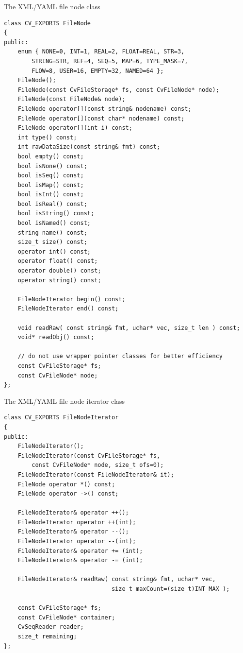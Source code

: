 \label{FileNode}
The XML/YAML file node class

\begin{lstlisting}
class CV_EXPORTS FileNode
{
public:
    enum { NONE=0, INT=1, REAL=2, FLOAT=REAL, STR=3,
        STRING=STR, REF=4, SEQ=5, MAP=6, TYPE_MASK=7,
        FLOW=8, USER=16, EMPTY=32, NAMED=64 };
    FileNode();
    FileNode(const CvFileStorage* fs, const CvFileNode* node);
    FileNode(const FileNode& node);
    FileNode operator[](const string& nodename) const;
    FileNode operator[](const char* nodename) const;
    FileNode operator[](int i) const;
    int type() const;
    int rawDataSize(const string& fmt) const;
    bool empty() const;
    bool isNone() const;
    bool isSeq() const;
    bool isMap() const;
    bool isInt() const;
    bool isReal() const;
    bool isString() const;
    bool isNamed() const;
    string name() const;
    size_t size() const;
    operator int() const;
    operator float() const;
    operator double() const;
    operator string() const;

    FileNodeIterator begin() const;
    FileNodeIterator end() const;

    void readRaw( const string& fmt, uchar* vec, size_t len ) const;
    void* readObj() const;

    // do not use wrapper pointer classes for better efficiency
    const CvFileStorage* fs;
    const CvFileNode* node;
};
\end{lstlisting}

\label{FileNodeIterator}
The XML/YAML file node iterator class

\begin{lstlisting}
class CV_EXPORTS FileNodeIterator
{
public:
    FileNodeIterator();
    FileNodeIterator(const CvFileStorage* fs,
        const CvFileNode* node, size_t ofs=0);
    FileNodeIterator(const FileNodeIterator& it);
    FileNode operator *() const;
    FileNode operator ->() const;

    FileNodeIterator& operator ++();
    FileNodeIterator operator ++(int);
    FileNodeIterator& operator --();
    FileNodeIterator operator --(int);
    FileNodeIterator& operator += (int);
    FileNodeIterator& operator -= (int);

    FileNodeIterator& readRaw( const string& fmt, uchar* vec,
                               size_t maxCount=(size_t)INT_MAX );

    const CvFileStorage* fs;
    const CvFileNode* container;
    CvSeqReader reader;
    size_t remaining;
};
\end{lstlisting}

